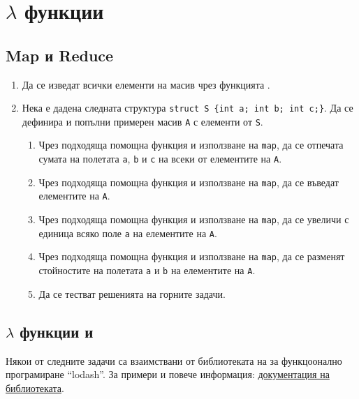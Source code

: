 \pagebreak

\clearpage

\section{$\lambda$ функции}

\subsection {Map и Reduce}

\begin{enumerate}[]  
  \item Да се изведат всички елементи на масив чрез функцията .
  
  \item Нека е дадена следната структура \texttt{struct S \{int a; int b; int c;\}}. Да се дефинира и попълни примерен масив \texttt{A} с елементи от  \texttt{S}. 
  
  \begin{enumerate}[label=\alph*)]
    \item Чрез подходяща помощна функция и използване на \texttt{map}, да се отпечата сумата на полетата \texttt{a}, \texttt{b} и \texttt{c} на всеки от елементите на \texttt{A}.
    \item Чрез подходяща помощна функция и използване на \texttt{map}, да се въведат елементите на \texttt{A}.
    \item Чрез подходяща помощна функция и използване на \texttt{map}, да се увеличи с единица всяко поле \texttt{a} на елементите на \texttt{A}.
    \item Чрез подходяща помощна функция и използване на \texttt{map}, да се разменят стойностите на полетата \texttt{a} и \texttt{b} на елементите на \texttt{A}.
    \item Да се тестват решенията на горните задачи.
    
  \end{enumerate}
  
\end{enumerate}

\subsection{$\lambda$ функции и }

\begin{mdframed}[hidealllines=true,backgroundcolor=gray!20]
  Някои от следните задачи са взаимствани от библиотеката на  за функцоонално програмиране ``lodash''. За примери и повече информация: \href{https://lodash.com/docs/4.17.15#after}{документация на библиотеката}.
\end{mdframed}

